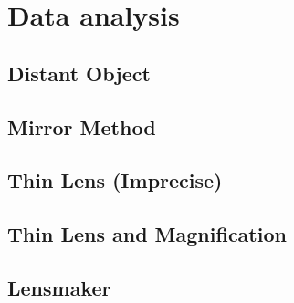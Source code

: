 \chapter{Data analysis}


\section{Distant Object}

\section{Mirror Method}

\section{Thin Lens (Imprecise)}

\section{Thin Lens and Magnification}

\section{Lensmaker}